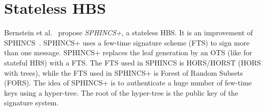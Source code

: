 \section{Stateless HBS}
Bernstein et al.~\cite{tweakable_basispaper_sphincs_2019} propose \textit{SPHINCS+}, a stateless HBS. It is an improvement of SPHINCS~\cite{sphincs_old_version_2015}.
SPHINCS+ uses a few-time signature scheme (FTS) to sign more than one message.
SPHINCS+ replaces the leaf generation by an OTS (like for stateful HBS) with a FTS.
The FTS used in SPHINCS is HORS/HORST (HORS with trees), while the FTS used in SPHINCS+ is Forest of Random Subsets (FORS). The idea of SPHINCS+ is to authenticate a huge number of few-time keys using a hyper-tree. The root of the hyper-tree is the public key of the signature system.
~\cite{tweakable_basispaper_sphincs_2019,sphincs+_submission_nist_round2}

